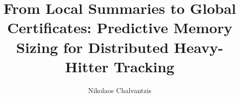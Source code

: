 \documentclass[sigconf, nonacm]{acmart}
\begin{document}
\title{From Local Summaries to Global Certificates: Predictive Memory Sizing for Distributed Heavy-Hitter Tracking}

\author{Nikolaos Chalvantzis}





\end{document}
